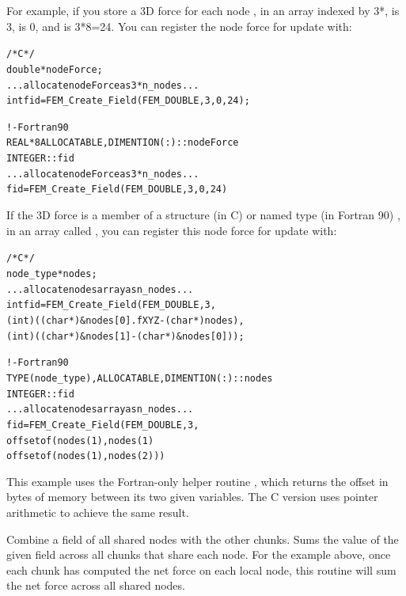 \documentclass[10pt]{article}
\begin{document}
     For example, if you store a 3D force for each node , in an array
indexed by 3*,  is 3,  is 0, and  is
3*8=24.  You can register the node force for update with:

\begin{alltt}
          /* C */
          double *nodeForce;
          ... allocate nodeForce as 3*n_nodes...
          int fid=FEM_Create_Field(FEM_DOUBLE,3,0,24);
 
          ! - Fortran90
          REAL*8 ALLOCATABLE, DIMENTION(:) :: nodeForce
          INTEGER :: fid
          ... allocate nodeForce as 3*n_nodes...
          fid=FEM_Create_Field(FEM_DOUBLE,3,0,24)
\end{alltt}

     If the 3D force is a member  of a structure (in C) or named type
(in Fortran 90) , in an array called , you can
register this node force for update with:

\begin{alltt}
          /* C */
          node_type *nodes;
          ...allocate nodes array as n_nodes...
          int fid=FEM_Create_Field(FEM_DOUBLE,3,
              (int)((char *)\&nodes[0].fXYZ-(char *)nodes),
              (int)((char *)\&nodes[1]-(char *)\&nodes[0]) );
 
          ! - Fortran90
          TYPE(node_type), ALLOCATABLE, DIMENTION(:) :: nodes
          INTEGER :: fid
          ...allocate nodes array as n_nodes...
          fid=FEM_Create_Field(FEM_DOUBLE,3,
              offsetof(nodes(1), nodes(1)%
              offsetof(nodes(1), nodes(2)) )
\end{alltt}

     This example uses the Fortran-only helper routine , which
     returns the offset in bytes of memory between its two given
     variables.  The C version uses pointer arithmetic to achieve the
     same result.


     Combine a field of all shared nodes with the other chunks.  Sums
     the value of the given field across all chunks that share each
     node.  For the example above, once each chunk has computed the net
     force on each local node, this routine will sum the net force
     across all shared nodes.
\end{document}
